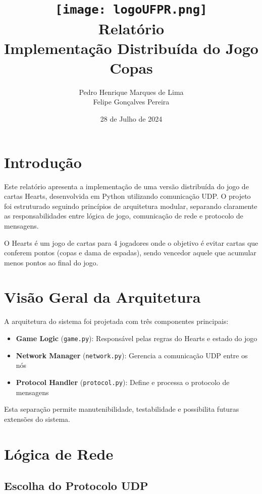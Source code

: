 \documentclass[12pt,a4paper]{article}
\title{
    \texttt{[image: logoUFPR.png]} \\
    \vspace*{1cm}
    {\huge\bfseries Relatório} \\
    \vspace*{1cm}
    {\Large Implementação Distribuída do Jogo Copas} \\
    \vspace*{7cm}
}
\author{Pedro Henrique Marques de Lima \\ Felipe Gonçalves Pereira}
\date{28 de Julho de 2024}
\begin{document}
\maketitle

\newpage
\tableofcontents
\newpage

\section{Introdução}

Este relatório apresenta a implementação de uma versão distribuída do jogo de cartas Hearts, desenvolvida em Python utilizando comunicação UDP. O projeto foi estruturado seguindo princípios de arquitetura modular, separando claramente as responsabilidades entre lógica de jogo, comunicação de rede e protocolo de mensagens.

O Hearts é um jogo de cartas para 4 jogadores onde o objetivo é evitar cartas que conferem pontos (copas e dama de espadas), sendo vencedor aquele que acumular menos pontos ao final do jogo.

\section{Visão Geral da Arquitetura}

A arquitetura do sistema foi projetada com três componentes principais:

\begin{itemize}
    \item \textbf{Game Logic} (\texttt{game.py}): Responsável pelas regras do Hearts e estado do jogo
    \item \textbf{Network Manager} (\texttt{network.py}): Gerencia a comunicação UDP entre os nós
    \item \textbf{Protocol Handler} (\texttt{protocol.py}): Define e processa o protocolo de mensagens
\end{itemize}

Esta separação permite manutenibilidade, testabilidade e possibilita futuras extensões do sistema.

\section{Lógica de Rede}

\subsection{Escolha do Protocolo UDP}
\end{document}
